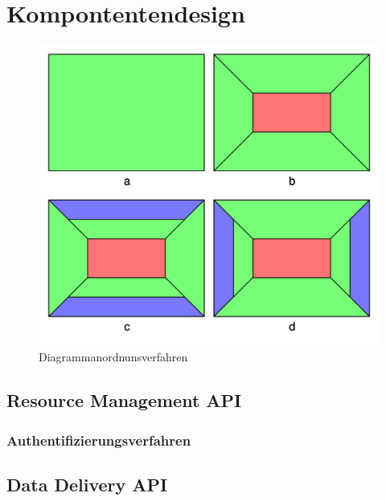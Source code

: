 \chapter{Kompontentendesign}
\label{chap:komponentendesign}



\begin{figure}
    \label{figure:diagrammanordnungsverfahren}
    \begin{center}
    \includegraphics[scale=0.2]{img/abbildungen/Diagrammanordnunsverfahren}
    \end{center}
    \caption{Diagrammanordnunsverfahren}
\end{figure}

\section{Resource Management API}
\label{sec:resourcemanagementapi}

\subsection{Authentifizierungsverfahren}
\label{subsec:authentifizierungsverfahren}

\section{Data Delivery API}
\label{sec:datadeliveryapi}

